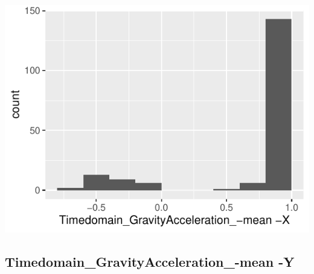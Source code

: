 \documentclass[
]{article}
\begin{document}
\begin{minipage}{0.25 \textwidth}

\includegraphics{codebook_tidydatasub_files/figure-latex/Var-9-Timedomain-GravityAcceleration--mean--X-1.pdf}

\end{minipage}

\noindent\makebox[\linewidth]{\rule{\textwidth}{0.4pt}}

\hypertarget{timedomain_gravityacceleration_-mean--y}{%
\subsection{Timedomain\_GravityAcceleration\_-mean
-Y}\label{timedomain_gravityacceleration_-mean--y}}
\end{document}
